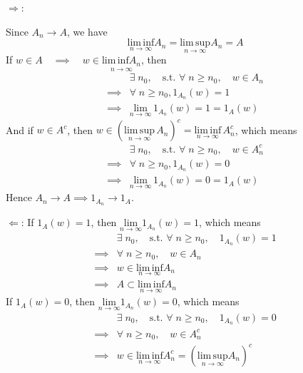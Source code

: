 \begin{list}{1.9.}{}
  
\item $\Longrightarrow$:
  \par
  Since $A_n \rightarrow A$, we have
  \[
    \underset{n\to\infty}{\mathrm{lim\,inf}}A_n = \underset{n\to\infty}{\mathrm{lim\,sup}}A_n = A
  \]
  If $w \in A\quad\implies\quad w \in \underset{n\to\infty}{\mathrm{lim\,inf}A_n}$, then
  \[
    \begin{aligned}
      & \exists\;n_0,\quad\text{s.t. }\forall\; n \geq n_0,\quad w \in A_n    \\
      \implies & \forall\; n \geq n_0, 1_{A_n}(w) = 1    \\
      \implies & \underset{n\to\infty}{\mathrm{lim}}\,1_{A_n}\left(w\right) = 1 = 1_{A}\left(w\right)
    \end{aligned}
  \]
  And if $ w \in A^c$, then $w \in \left(\underset{n\to\infty}{\mathrm{lim\,sup}}\,A_n\right)^c = \underset{n\to\infty}{\mathrm{lim\,inf}}\,A_n^c$, which means
  \[
    \begin{aligned}
      & \exists\;n_0,\quad\text{s.t. }\forall\; n \geq n_0,\quad w \in A_n^c    \\
      \implies & \forall\; n \geq n_0, 1_{A_n}(w) = 0    \\
      \implies & \underset{n\to\infty}{\mathrm{lim}}\,1_{A_n}\left(w\right) = 0 = 1_{A}\left(w\right)
    \end{aligned}
  \]
  Hence $A_n\rightarrow A \implies 1_{A_n}\rightarrow 1_{A}$.
  \par
  $\Longleftarrow$:
  If $1_A(w) = 1$, then $\underset{n\to\infty}{\mathrm{lim}}1_{A_n}\left(w\right) = 1$, which means
  \[
    \begin{aligned}
      &\exists\; n_0,\quad\text{s.t. }\forall\; n \geq n_0,\quad 1_{A_n}\left(w\right) = 1    \\
      \implies & \forall\; n \geq n_0,\quad w \in A_n    \\
      \implies & w \in \underset{n\to\infty}{\mathrm{lim\,inf}}A_n    \\
      \implies & A \subset \underset{n\to\infty}{\mathrm{lim\,inf}}A_n
    \end{aligned}
  \]
  If $1_A(w) = 0$, then $\underset{n\to\infty}{\mathrm{lim}}1_{A_n}\left(w\right) = 0$, which means
  \[
    \begin{aligned}
      &\exists\; n_0,\quad\text{s.t. }\forall\; n \geq n_0,\quad 1_{A_n}\left(w\right) = 0    \\
      \implies & \forall\; n \geq n_0,\quad w \in A_n^c    \\
      \implies & w \in \underset{n\to\infty}{\mathrm{lim\,inf}}A_n^c = \left(\underset{n\to\infty}{\mathrm{lim\,sup}}A_n\right)^c    \\

\end{aligned}\]
\end{list}
